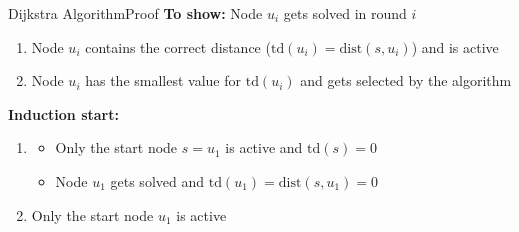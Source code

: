 
\begin{frame}{Dijkstra Algorithm}{Proof}
  \textbf{To show:} Node {\color{MainA}$u_i$} gets solved in round
  {\color{MainA}$i$}
  \begin{enumerate}
    \item
      Node {\color{MainA}$u_i$} contains the correct distance
      ({\color{MainA}$\mathrm{td}(u_i) = \mathrm{dist}(s, u_i)$})
      and is active
    \item
      Node {\color{MainA}$u_i$} has the smallest value for
      {\color{MainA}$\mathrm{td}(u_i)$} and gets selected by the algorithm
  \end{enumerate}
  \vspace{1.0em}
  \textbf{Induction start:}
  \begin{enumerate}
    \item
      \begin{itemize}
        \item
          Only the start node {\color{MainA}$s = u_1$} is active and
          {\color{MainA}$\mathrm{td}(s) = 0$}
        \item
          Node {\color{MainA}$u_1$} gets solved and
          {\color{MainA}$\mathrm{td}(u_1) = \mathrm{dist}(s, u_1) = 0$}
      \end{itemize}
    \item
      Only the start node {\color{MainA}$u_1$} is active
  \end{enumerate}
\end{frame}


